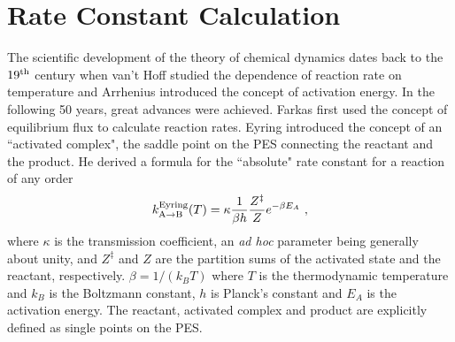 \section{Rate Constant Calculation}

The scientific development of the theory of chemical dynamics dates back to the $19^{\rm th}$ century when van't Hoff studied the dependence of reaction rate on temperature \cite{vantHoff1884} and Arrhenius introduced the concept of activation energy.\cite{Arrhenius1889}
In the following 50 years, great advances were achieved.
Farkas first used the concept of equilibrium flux to calculate reaction rates.\cite{Farkas1927}
Eyring introduced the concept of an ``activated complex",\cite{Eyring1935} the saddle point on the PES connecting the reactant and the product.
He derived a formula for the ``absolute" rate constant for a reaction of any order
\begin{equation}
\label{eq:eyring}
k^{\rm Eyring}_{\rm A\rightarrow B}(T) = \kappa \frac{1}{\beta h} \frac{Z^{\ddagger}}{Z} e^{- \beta E_A} ~,
\end{equation}
where $\kappa$ is the transmission coefficient, an {\it ad hoc} parameter being generally about unity, and $Z^{\ddagger}$ and $Z$ are the partition sums of the activated state and the reactant, respectively. $\beta = 1 / ( k_B T )$ where $T$ is the thermodynamic temperature and $k_B$ is the Boltzmann constant, $h$ is Planck's constant and $E_A$ is the activation energy.
The reactant, activated complex and product are explicitly defined as single points on the PES.

